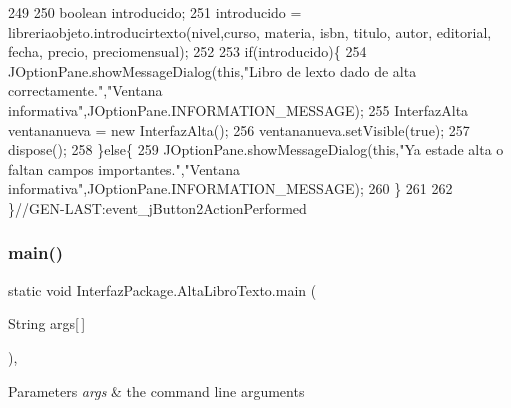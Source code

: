 \begin{DoxyCode}
249         
250         \textcolor{keywordtype}{boolean} introducido;
251         introducido = libreriaobjeto.introducirtexto(nivel,curso, materia, isbn, titulo, autor, editorial, 
      fecha, precio, preciomensual);
252         
253         \textcolor{keywordflow}{if}(introducido)\{
254             JOptionPane.showMessageDialog(\textcolor{keyword}{this},\textcolor{stringliteral}{"Libro de lexto dado de alta correctamente."},\textcolor{stringliteral}{"Ventana
       informativa"},JOptionPane.INFORMATION\_MESSAGE);
255             InterfazAlta ventananueva = \textcolor{keyword}{new} InterfazAlta();
256             ventananueva.setVisible(\textcolor{keyword}{true});
257             dispose();
258         \}\textcolor{keywordflow}{else}\{
259             JOptionPane.showMessageDialog(\textcolor{keyword}{this},\textcolor{stringliteral}{"Ya estade alta o faltan campos importantes."},\textcolor{stringliteral}{"Ventana
       informativa"},JOptionPane.INFORMATION\_MESSAGE);
260         \}
261         
262     \}\textcolor{comment}{//GEN-LAST:event\_jButton2ActionPerformed}
\end{DoxyCode}
\mbox{\label{class_interfaz_package_1_1_alta_libro_texto_a9a891823797c2520bc34cb78d91e6e91}} 
\subsubsection{\texorpdfstring{main()}{main()}}
{\footnotesize\ttfamily static void Interfaz\+Package.\+Alta\+Libro\+Texto.\+main (\begin{DoxyParamCaption}\item[{String}]{args\mbox{[}$\,$\mbox{]} }\end{DoxyParamCaption})\hspace{0.3cm}{\ttfamily [inline]}, {\ttfamily [static]}}


\begin{DoxyParams}{Parameters}
{\em args} & the command line arguments \\
\hline
\end{DoxyParams}

